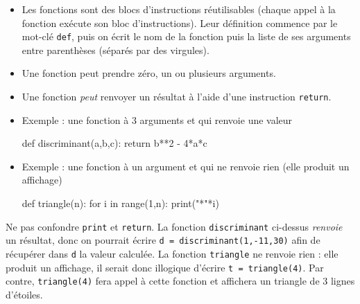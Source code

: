\documentclass[11pt,a4paper]{article}
\begin{document}
\begin{tcolorbox}[left=0cm,title=\bf{\faPython \; Fonctions},colbacktitle=cfond]
\begin{itemize}
\item[\textbullet] Les fonctions sont des blocs d'instructions réutilisables (chaque appel à la fonction exécute son bloc d'instructions). Leur définition commence par le mot-clé {\tt def}, puis on écrit le nom de la fonction puis la liste de ses arguments entre parenthèses (séparés par des virgules).
\item[\textbullet] Une fonction peut prendre zéro, un ou plusieurs arguments.
\item[\textbullet] Une fonction \textit{peut} renvoyer un résultat à l'aide d'une instruction {\tt return}.
\item[\textbullet] Exemple : une fonction à 3 arguments et qui renvoie une valeur 
\begin{python}
def discriminant(a,b,c):
	return b**2 - 4*a*c
\end{python}
\item[\textbullet] Exemple : une fonction à un argument et qui ne renvoie rien (elle produit un affichage)
\begin{python}
def triangle(n):
	for i in range(1,n):
		print("*"*i) 
\end{python}
\end{itemize}
{\small \danger} Ne pas confondre {\tt print} et {\tt return}. La fonction {\tt discriminant} ci-dessus \textit{renvoie} un résultat, donc on pourrait écrire {\tt d = discriminant(1,-11,30)} afin de récupérer dans {\tt d} la valeur calculée. La fonction {\tt triangle} ne renvoie rien : elle produit un affichage, il serait donc illogique d'écrire {\tt t~=~triangle(4)}. Par contre, {\tt triangle(4)} fera appel à cette fonction et affichera un triangle de 3 lignes d'étoiles.
\end{tcolorbox}
\end{document}

